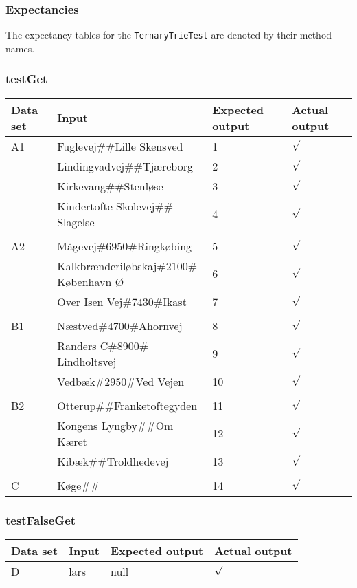 \pagebreak
\subsubsection{Expectancies}
The expectancy tables for the \texttt{TernaryTrieTest} are denoted by their method names.

\subsubsection*{testGet}
\begin{tabular}{ p{1.5cm} | p{8cm} | p{2cm} | p{1cm} }
	\textbf{Data set} & \textbf{Input} & \textbf{Expected output} & \textbf{Actual output} \\	
	\hline
	A1 & Fuglevej$\#\#$Lille Skensved & 1 & $\surd$ \\
	& Lindingvadvej$\#\#$Tj\ae reborg & 2 & $\surd$ \\
	& Kirkevang$\#\#$Stenl\o se & 3 & $\surd$ \\
	& Kindertofte Skolevej$\#\#$Slagelse & 4 & $\surd$ \\
	&&&\\	
	A2 & M\aa gevej$\#6950\#$Ringk\o bing & 5 & $\surd$ \\
	& Kalkbr\ae nderil\o bskaj$\#2100\#$K\o benhavn \O  & 6 & $\surd$ \\
	& Over Isen Vej$\#7430\#$Ikast & 7 & $\surd$ \\
	&&&\\
	B1 & N\ae stved$\#4700\#$Ahornvej & 8 & $\surd$ \\
	& Randers C$\#8900\#$Lindholtsvej & 9 & $\surd$ \\
	& Vedb\ae k$\#2950\#$Ved Vejen & 10 & $\surd$ \\
	&&&\\
	B2 & Otterup$\#\#$Franketoftegyden & 11 & $\surd$ \\
	& Kongens Lyngby$\#\#$Om K\ae ret & 12 & $\surd$ \\
	& Kib\ae k$\#\#$Troldhedevej & 13 & $\surd$ \\
	&&&\\
	C & K\o ge$\#\#$ & 14 & $\surd$ \\
\end{tabular}

\subsubsection*{testFalseGet}
\begin{tabular}{ p{1.5cm} | p{8cm} | p{2cm} | p{1cm} }
	\textbf{Data set} & \textbf{Input} & \textbf{Expected output} & \textbf{Actual output} \\	
	\hline
	D & lars & null & $\surd$
\end{tabular}
\pagebreak

